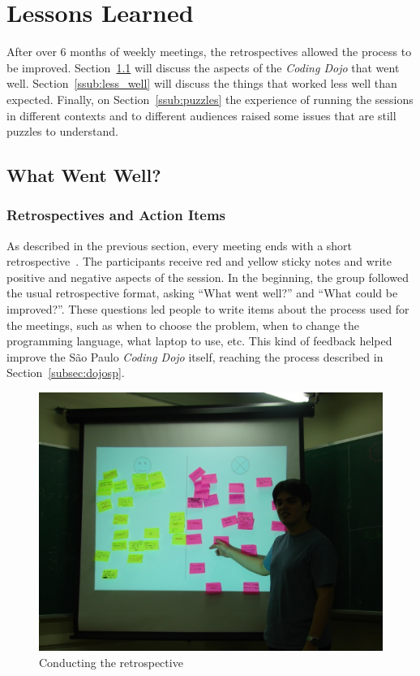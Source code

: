 \section{Lessons Learned}\label{sec:lessons_learned}

After over 6 months of weekly meetings, the retrospectives allowed
the process to be improved. Section~\ref{ssub:well} will discuss the
aspects of the \emph{Coding Dojo} that went well. Section~\ref{ssub:less_well}
will discuss the things that worked less well than expected. Finally, on
Section~\ref{ssub:puzzles} the experience of running the sessions in different
contexts and to different audiences raised some issues that are still puzzles
to understand.

\subsection{What Went Well?}\label{ssub:well}

\subsubsection{Retrospectives and Action Items}

As described in the previous section, every meeting ends with a
short retrospective~\cite{Retro}. The participants receive red and yellow sticky
notes and write positive and negative aspects of the session. In the
beginning, the group followed the usual retrospective format,
asking ``What went well?'' and ``What could be improved?''.
These questions led people to write items about the process used for
the meetings, such as when to choose the problem, when to change the
programming language, what laptop to use, etc. This kind of feedback
helped improve the São Paulo \emph{Coding Dojo} itself, reaching the
process described in Section~\ref{subsec:dojosp}.

\begin{figure}[htp]
\centering
\includegraphics[width=\columnwidth]{retrospective}
\caption{Conducting the retrospective}\label{fig:retrospective}
\end{figure}

